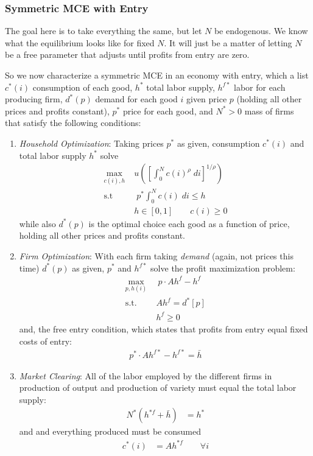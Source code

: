 \documentclass[12pt]{article}
\theoremstyle{plain}
\theoremstyle{definition}
\theoremstyle{remark}
\newcommand{\intzN}{\int_0^N}
\begin{document}
\clearpage
\subsubsection{Symmetric MCE with Entry}

The goal here is to take everything the same, but let $N$ be endogenous.
We know what the equilibrium looks like for fixed $N$. It will just be a
matter of letting $N$ be a free parameter that adjusts until profits
from entry are zero.

So we now characterize a symmetric MCE in an economy with entry, which a
list
$c^*(i)$ consumption of each good,
$h^*$ total labor supply,
$h^{f*}$ labor for each producing firm,
$d^*(p)$ demand for each good $i$ given price $p$ (holding all other
prices and profits constant),
$p^*$ price for each good,
and $N^*>0$ mass of firms that satisfy the following conditions:
\begin{enumerate}
  \item \emph{Household Optimization}: Taking prices $p^*$ as given,
    consumption $c^*(i)$ and total labor supply $h^*$ solve
    \begin{align*}
      \max_{c(i), h}
        & \; u\left(
          \left[ \int_0^N c(i)^\rho \; di \right]^{1/\rho}
        \right)\\
      \text{s.t} & \;\;
         p^*\intzN c(i) \; di \leq h \\
      &\; h\in[0,1]
      \qquad c(i) \geq 0
    \end{align*}
    while also $d^*(p)$ is the optimal choice each good as a function of
    price, holding all other prices and profits constant.

  \item \emph{Firm Optimization}: With each firm taking \emph{demand}
    (again, not prices this time) $d^*(p)$ as given, $p^*$ and
    $h^{f*}$ solve the profit maximization problem:
    \begin{align*}
      \max_{p,h(i)} &\;\
      p\cdot Ah^f - h^f \\
      \text{s.t.} \;
      & \; Ah^f = d^*[p] \\
      & \; h^f \geq 0
    \end{align*}
    and, the free entry condition, which states that profits from entry
    equal fixed costs of entry:
    \begin{align*}
      p^*\cdot Ah^{f*} - h^{f*} = \bar{h}
    \end{align*}

  \item \emph{Market Clearing}: All of the labor employed by the
    different firms in production of output and production of variety
    must equal the total labor supply:
    \begin{align*}
        N^*(h^{*f}+\bar{h}) &= h^*
    \end{align*}
    and and everything produced must be consumed
    \begin{align*}
        c^*(i) &= Ah^{*f} \qquad \forall i
    \end{align*}
\end{enumerate}
\end{document}
